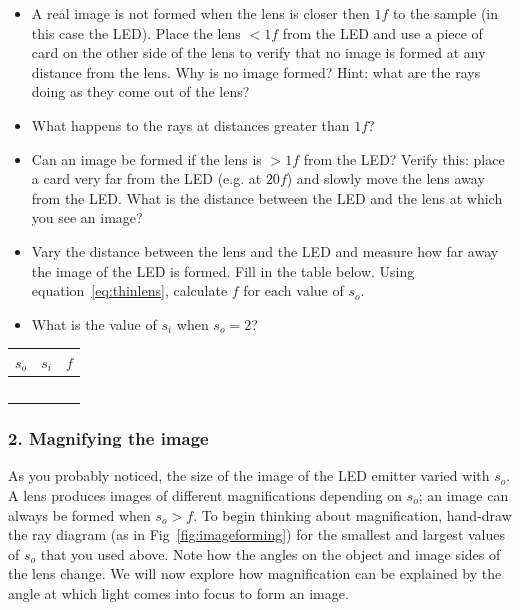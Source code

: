 \documentclass[a4paper]{report}
\begin{document}
\begin{itemize}
\item A real image is not formed when the lens is closer then $1f$ to the sample (in this case the LED). 
Place the lens $<1f$ from the LED and use a piece of card on the other side of the lens to verify that no image is formed at any distance from the lens.
Why is no image formed? Hint: what are the rays doing as they come out of the lens? 
\item What happens to the rays at distances greater than $1f$? 
\item Can an image be formed if the lens is $>1f$ from the LED? 
Verify this: place a card very far from the LED (e.g. at $20f$) and slowly move the lens away from the LED. 
What is the distance between the LED and the lens at which you see an image? 
\item Vary the distance between the lens and the LED and measure how far away the image of the LED is formed. 
Fill in the table below. 
Using equation~\ref{eq:thinlens}, calculate $f$ for each value of $s_o$.
\item What is the value of $s_i$ when $s_o=2$?
\end{itemize}

\vspace{2em}
\begin{tabular}{| p{1cm} | p{1cm} | p{1cm} |}
\hline
 $s_o$  &  $s_i$  &  $f$  \\
\hline
\hline
 & & \\ \hline
 & & \\ \hline
 & & \\ \hline
 & & \\ \hline
 & & \\ \hline
\end{tabular}


\subsubsection{2. Magnifying the image}
As you probably noticed, the size of the image of the LED emitter varied with $s_o$.
A lens produces images of different magnifications depending on $s_o$; an image can always be formed when $s_o>f$. 
To begin thinking about magnification, hand-draw the ray diagram (as in Fig~\ref{fig:imageforming}) for the smallest and largest values of $s_o$ that you used above. 
Note how the angles on the object and image sides of the lens change.
We will now explore how magnification can be explained by the angle at which light comes into focus to form an image. 
\end{document}
